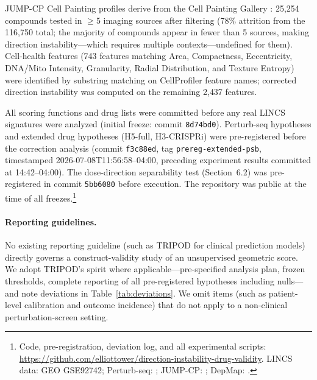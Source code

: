 \documentclass[11pt]{article}
\begin{document}
JUMP-CP Cell Painting profiles derive from the Cell Painting Gallery
\citep{chandrasekaran2023jump}: 25{,}254 compounds tested in $\geq$5
imaging sources after filtering (78\% attrition from the 116{,}750
total; the majority of compounds appear in fewer than 5 sources,
making direction instability---which requires multiple
contexts---undefined for them). Cell-health features (743 features matching Area,
Compactness, Eccentricity, DNA/Mito Intensity, Granularity, Radial
Distribution, and Texture Entropy) were identified by substring matching
on CellProfiler feature names; corrected direction instability was computed
on the remaining 2{,}437 features.

All scoring functions and drug lists were committed before any real LINCS
signatures were analyzed (initial freeze: commit \texttt{8d74bd0}).
Perturb-seq hypotheses and extended drug hypotheses (H5-full,
H3-CRISPRi) were pre-registered before the correction analysis
(commit \texttt{f3c88ed}, tag \texttt{prereg-extended-psb}, timestamped
2026-07-08T11:56:58--04:00, preceding experiment results committed at
14:42--04:00). The dose-direction separability test
(Section~6.2) was pre-registered in commit \texttt{5bb6080} before
execution. The repository was public at the time of all freezes.\footnote{Code, pre-registration, deviation log, and all
experimental scripts:
\url{https://github.com/elliottower/direction-instability-drug-validity}.
LINCS data: GEO GSE92742; Perturb-seq: \citet{replogle2022mapping};
JUMP-CP: \citet{chandrasekaran2023jump}; DepMap: \citet{dempster2021chronos}.}

\paragraph{Reporting guidelines.}
No existing reporting guideline (such as TRIPOD for clinical prediction models)
directly governs a construct-validity study of an unsupervised geometric score.
We adopt TRIPOD's spirit where applicable---pre-specified analysis plan,
frozen thresholds, complete reporting of all pre-registered hypotheses
including nulls---and note deviations in Table~\ref{tab:deviations}.
We omit items (such as patient-level calibration and outcome incidence) that
do not apply to a non-clinical perturbation-screen setting.
\end{document}
